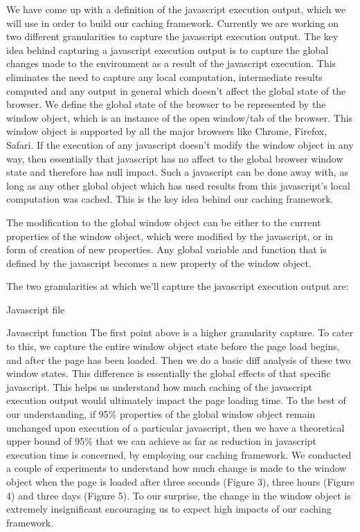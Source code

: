 We have come up with a definition of the javascript execution output, which we will use in order
to build our caching framework. Currently we are working on two different granularities to 
capture the javascript execution output. The key idea behind capturing a javascript execution output 
is to capture the global changes made to the environment as a result of the javascript execution. 
This eliminates the need to capture any local computation, intermediate results computed and any output
in general which doesn't affect the global state of the browser. 
We define the global state of the browser to be represented by the window object, which is
an instance of the open window/tab of the browser. This window object is supported by all the 
major browsers like Chrome, Firefox, Safari. 
If the execution of any javascript doesn't modify the window object in any way, then essentially
that javascript has no affect to the global browser window state and therefore has null impact.
Such a javascript can be done away with, as long as any other global object which has used results
from this javascript's local computation was cached. This is the key idea behind our caching framework. 

The modification to the global window object can be either to the current properties of the window
object, which were modified by the javascript, or in form of creation of new properties. Any global variable
and function that is defined by the javascript becomes a new property of the window object.

The two granularities at which we'll capture the javascript execution output are:
\squishenum
\item Javascript file 
\item Javascript function
\squishenumend
The first point above is a higher granularity capture. To cater to this, we capture the entire window object state
before the page load begins, and after the page has been loaded. Then we do a basic diff analysis of these
two window states. This difference is essentially the global effects of that specific javascript. 
This helps us understand how much caching of the javascript execution output would ultimately impact the 
page loading time. 
To the best of our understanding, if 95\% properties of the global window object remain unchanged upon execution
of a particular javascript, then we have a theoretical upper bound of 95\% that we can achieve as far as reduction in 
javascript execution time is concerned, by employing our caching framework. We conducted a couple of experiments 
to understand how much change is made to the window object when the page is loaded after three seconds (Figure 3),
three hours (Figure 4) and three days (Figure 5). 
To our surprise, the change in the window object is extremely insignificant encouraging us to expect high impacts
of our caching framework. 

